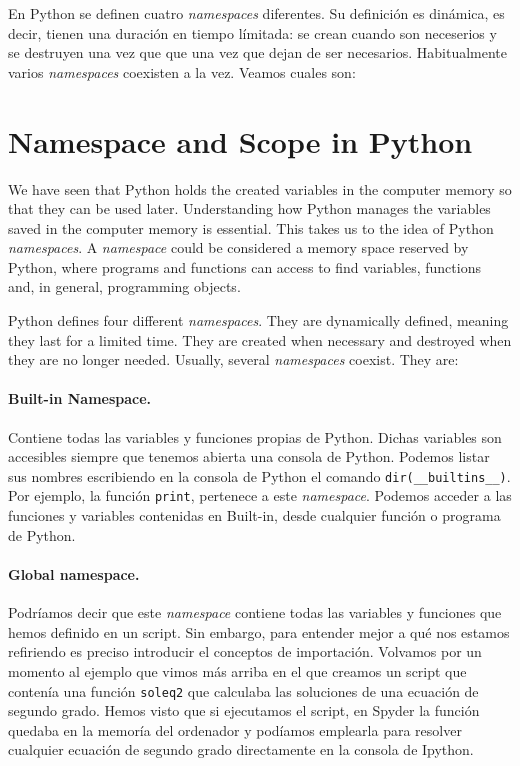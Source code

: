 \begin{paracol}{2}
En Python se definen cuatro \emph{namespaces} diferentes. Su definición es dinámica, es decir, tienen una duración en tiempo límitada: se crean cuando son neceserios y se destruyen una vez que que una vez que dejan de ser necesarios. Habitualmente varios \emph{namespaces} coexisten a la vez. Veamos cuales son:

\switchcolumn
\section[Namespace and scope in Python]{Namespace and Scope in Python}
We have seen that Python holds the created variables in the computer memory so that they can be used later. Understanding how Python manages the variables saved in the computer memory is essential. This takes us to the idea of Python \emph{namespaces}.
A \emph{namespace} could be considered a memory space reserved by Python, where programs and functions can access to find variables, functions and, in general, programming objects.

Python defines four different \emph{namespaces}. They are dynamically defined, meaning they last for a limited time. They are created when necessary and destroyed when they are no longer needed. Usually, several \emph{namespaces} coexist. They are:

\switchcolumn
\paragraph{Built-in Namespace.} Contiene todas las variables y funciones propias de Python. Dichas variables son accesibles siempre que tenemos abierta una consola de Python. Podemos listar sus nombres escribiendo en la consola de Python el comando \texttt{dir(__builtins__)}. Por ejemplo, la función \texttt{print}, pertenece a este \emph{namespace}. Podemos acceder a las funciones y variables contenidas en Built-in, desde cualquier función o programa de Python.

\paragraph{Global namespace.} Podríamos decir que este \emph{namespace} contiene todas las variables y funciones que hemos definido en un script. Sin embargo, para entender mejor a qué nos estamos refiriendo es preciso introducir el conceptos de importación. Volvamos por un momento al ejemplo que vimos más arriba en el que creamos un script que contenía una función \texttt{soleq2} que calculaba las soluciones de una ecuación de segundo grado. Hemos visto que si ejecutamos el script, en Spyder la función quedaba en la memoría del ordenador y podíamos emplearla para resolver cualquier ecuación de segundo grado directamente en la consola de Ipython.


\end{paracol}
